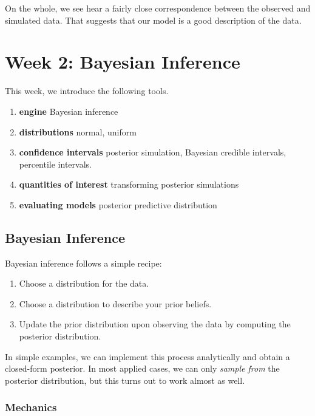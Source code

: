 \documentclass[
]{book}
\providecommand{\tightlist}{%
  \setlength{\itemsep}{0pt}\setlength{\parskip}{0pt}}
\begin{document}
On the whole, we see hear a fairly close correspondence between the
observed and simulated data. That suggests that our model is a good
description of the data.

\hypertarget{week-2-bayesian-inference}{%
\chapter{Week 2: Bayesian Inference}\label{week-2-bayesian-inference}}

This week, we introduce the following tools.

\begin{enumerate}
\def\labelenumi{\arabic{enumi}.}
\tightlist
\item
  \textbf{engine} Bayesian inference
\item
  \textbf{distributions} normal, uniform
\item
  \textbf{confidence intervals} posterior simulation, Bayesian credible
  intervals, percentile intervals.
\item
  \textbf{quantities of interest} transforming posterior simulations
\item
  \textbf{evaluating models} posterior predictive distribution
\end{enumerate}

\hypertarget{bayesian-inference}{%
\section{Bayesian Inference}\label{bayesian-inference}}

Bayesian inference follows a simple recipe:

\begin{enumerate}
\def\labelenumi{\arabic{enumi}.}
\tightlist
\item
  Choose a distribution for the data.
\item
  Choose a distribution to describe your prior beliefs.
\item
  Update the prior distribution upon observing the data by computing the
  posterior distribution.
\end{enumerate}

In simple examples, we can implement this process analytically and
obtain a closed-form posterior. In most applied cases, we can only
\emph{sample from} the posterior distribution, but this turns out to
work almost as well.

\hypertarget{mechanics}{%
\subsection{Mechanics}\label{mechanics}}
\end{document}
